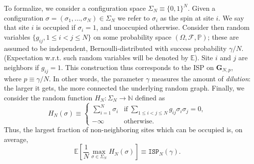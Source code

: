 \documentclass[a4paper,12pt,oneside,reqno]{amsart}
\numberwithin{equation}{section}
\begin{document}
To formalize, we consider a configuration space $\Sigma_N {\equiv} \{0, 1\}^N$. Given a configuration ${\sigma} = ({\sigma}_1, \dots, {\sigma}_N) \in \Sigma_N$ we refer to ${\sigma}_i$ as the spin at site $i$. We say that site $i$ is occupied if ${\sigma}_i = 1$, and unoccupied otherwise. Consider then random variables $\{g_{ij}, 1 \leq i < j \leq N\}$ on some probability space $(\Omega, \mathcal F, {\mathbb{P}})$; these are assumed to be independent, Bernoulli-distributed with success probability $\gamma/N$. (Expectation w.r.t. such random variables will be denoted by ${{\mathbb{E}}}$). Site $i$ and $j$ are neighbors if $g_{ij} = 1$. This construction thus corresponds to the ISP on $\mathbf G_{N, p}$, where $p {\equiv} \gamma/N$. In other words, the parameter $\gamma$ measures the amount of {\it dilution}: the larger it gets, the more connected the underlying random graph. Finally, we consider the random function $H_N: \Sigma_N \to {\mathbb{N}}$ defined as 
\begin{equation} \label{hardcore}
H_{N}({\sigma}) {\equiv} \begin{cases}
\sum_{i=1}^N {\sigma}_i  & \text{if} \; \sum_{1 \leq i < j \leq N} g_{ij} {\sigma}_i {\sigma}_j =  0, \\
- \infty & \text{otherwise}.
\end{cases}
\end{equation}
Thus, the largest fraction of non-neighboring sites which can be occupied is, on average, 
\begin{equation}
{{\mathbb{E}}}\left[ \frac{1}{N}  \max_{{\sigma} \in  \Sigma_N} H_N({\sigma}) \right] {\equiv} \texttt{ISP}_N(\gamma).
\end{equation}
\end{document}
